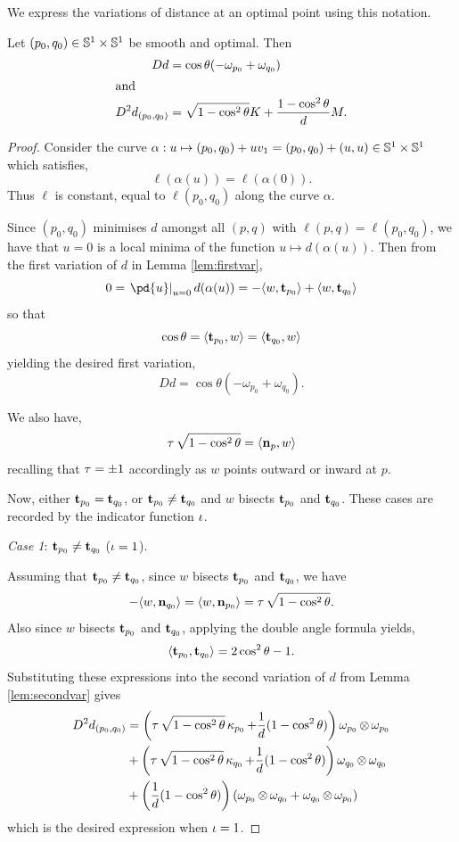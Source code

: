 \documentclass[11pt]{amsart}
\begin{document}
We express the variations of distance at an optimal point using this notation.

\begin{prop}
\label{prop:spatial_var}
Let $(p_0, q_0) \in \mathbb{S}^1 \times \mathbb{S}^1$ be smooth and optimal. Then
\[
\begin{split}
D d &= \cos\theta(-\omega_{p_0} + \omega_{q_0}) \\
\intertext{and}
D^2d_{(p_0,q_0)} &= \sqrt{1-\cos^2\theta}K + \frac{1-\cos^2 \theta}{d} M.
\end{split}
\]
\end{prop}

\begin{proof}
Consider the curve $\alpha: u \mapsto (p_0,q_0) + uv_1 = (p_0,q_0) + (u, u) \in \mathbb{S}^1\times \mathbb{S}^1$ which satisfies,
\[
\ell(\alpha(u)) = \ell(\alpha(0)).
\]
Thus $\ell$ is constant, equal to $\ell(p_0, q_0)$ along the curve $\alpha$.

Since $(p_0, q_0)$ minimises $d$ amongst all $(p,q)$ with $\ell(p, q) = \ell(p_0, q_0)$, we have that $u=0$ is a local minima of the function $u\mapsto d(\alpha(u))$. Then from the first variation of $d$ in Lemma \ref{lem:firstvar},
\[
0 = \left.\pd{u}\right|_{u=0} d(\alpha(u)) = -\ip{w}{\tang_{p_0}} + \ip{w}{\tang_{q_0}}
\]
so that
\[
\cos\theta = \langle{\operatorname{\mathbf{t}}_{p_0}},{w}\rangle = \langle{\operatorname{\mathbf{t}}_{q_0}},{w}\rangle
\]
yielding the desired first variation,
\[
Dd = \cos\theta(-\omega_{p_0} + \omega_{q_0}).
\]

We also have,
\[
\operatorname{\tau} \sqrt{1 - \cos^2 \theta} = \langle{\operatorname{\mathbf{n}}_p},{w}\rangle
\]
recalling that \(\operatorname{\tau} = \pm 1\) accordingly as \(w\) points outward or inward at \(p\).

Now, either $\operatorname{\mathbf{t}}_{p_0} = \operatorname{\mathbf{t}}_{q_0}$, or $\operatorname{\mathbf{t}}_{p_0} \ne \operatorname{\mathbf{t}}_{q_0}$ and $w$ bisects $\operatorname{\mathbf{t}}_{p_0}$ and $\operatorname{\mathbf{t}}_{q_0}$. These cases are recorded by the indicator function $\operatorname{\iota}$.

\emph{Case 1}: $\operatorname{\mathbf{t}}_{p_0} \ne \operatorname{\mathbf{t}}_{q_0}$ ($\operatorname{\iota} = 1$).

Assuming that $\operatorname{\mathbf{t}}_{p_0} \ne \operatorname{\mathbf{t}}_{q_0}$, since \(w\) bisects \(\operatorname{\mathbf{t}}_{p_0}\) and \(\operatorname{\mathbf{t}}_{q_0}\), we have
\[
-\langle{w},{\operatorname{\mathbf{n}}_{q_0}}\rangle = \langle{w},{\operatorname{\mathbf{n}}_{p_0}}\rangle = \operatorname{\tau} \sqrt{1-\cos^2\theta}.
\]
Also since $w$ bisects $\operatorname{\mathbf{t}}_{p_0}$ and $\operatorname{\mathbf{t}}_{q_0}$, applying the double angle formula yields,
\[
\langle{\operatorname{\mathbf{t}}_{p_0}},{\operatorname{\mathbf{t}}_{q_0}}\rangle = 2\cos^2\theta - 1.
\]
Substituting these expressions into the second variation of $d$ from Lemma \ref{lem:secondvar} gives
\begin{align*}
D^2d_{(p_0,q_0)} &=  \left(\operatorname{\tau} \sqrt{1-\cos^2\theta}\operatorname{\kappa}_{p_0} + \frac{1}{d}(1 - \cos^2\theta) \right) \omega_{p_0} \operatorname{\otimes} \omega_{p_0} \\
&+ \left(\operatorname{\tau} \sqrt{1-\cos^2\theta} \operatorname{\kappa}_{q_0} + \frac{1}{d}(1 - \cos^2\theta) \right) \omega_{q_0} \operatorname{\otimes} \omega_{q_0} \\
&+ \left(\frac{1}{d}(1 - \cos^2\theta) \right) \left(\omega_{p_0} \operatorname{\otimes} \omega_{q_0} + \omega_{q_0} \operatorname{\otimes} \omega_{p_0} \right)
\end{align*}
which is the desired expression when $\operatorname{\iota}=1$.


\end{proof}
\end{document}
